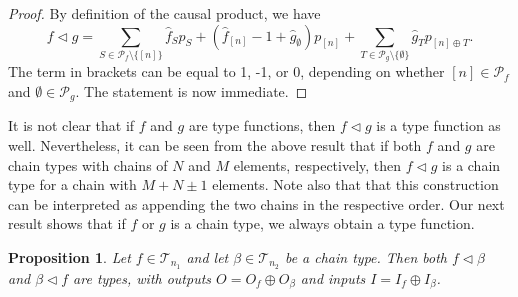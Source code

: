 \documentclass[12pt]{article}
\newtheorem{prop}{Proposition}
\theoremstyle{definition}
\theoremstyle{remark}
\def\Te{\mathcal T}
\def\Pe{\mathcal P}
\def\vtl{\vartriangleleft}
\begin{document}
\begin{proof} By definition of the causal product, we have  
\[
f\vtl g=\sum_{S\in \Pe_f\setminus\{[n]\}} \hat f_Sp_S+ (\hat f_{[n]}-1 + \hat
g_\emptyset)p_{[n]}+\sum_{T\in \Pe_g\setminus \{\emptyset\}} \hat g_T p_{[n]\oplus T}.
\]
The term in brackets can be equal to 1, -1, or 0, depending on whether $[n]\in \Pe_f$ and
$\emptyset\in \Pe_g$. The statement is now immediate.


\end{proof}



It is not clear that if $f$ and $g$ are type functions, then $f\vtl g$ is a type function as well. 
Nevertheless, it can be seen from the above result
that if both $f$ and $g$ are chain types with chains of $N$ and $M$ elements,
respectively, then $f\vtl g$ is a chain type for a chain with $M+N\pm 1$
elements. Note also that that this construction can be
interpreted as appending the two chains in the respective order. 
Our next result shows that if $f$ or $g$ is a chain type, we always obtain a type
function.




\begin{prop}\label{prop:append_chain_f}  Let $f\in \Te_{n_1}$ and let $\beta\in \Te_{n_2}$
be a chain type. Then both $f\vtl \beta$ and $\beta\vtl f$ are types, with outputs
$O=O_f\oplus O_\beta$ and inputs $I=I_f\oplus I_\beta$. 

\end{prop}
\end{document}
